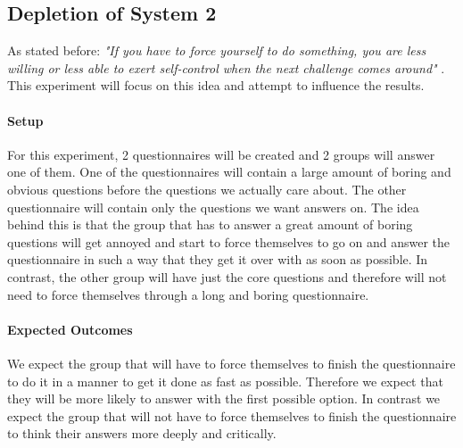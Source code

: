 \documentclass[main.tex]{subfiles}
\begin{document}
\subsection{Depletion of System 2}
As stated before:\emph{ "If you have to force yourself to do something, you are less willing or less able to exert self-control when the next challenge comes around" }.
This experiment will focus on this idea and attempt to influence the results.

\paragraph{Setup} For this experiment, 2 questionnaires will be created and 2 groups will answer one of them. One of the questionnaires will contain a large amount of boring and obvious questions before the questions we actually care about. The other questionnaire will contain only the questions we want answers on. The idea behind this is that the group that has to answer a great amount of boring questions will get annoyed and start to force themselves to go on and answer the questionnaire in such a way that they get it over with as soon as possible. In contrast, the other group will have just the core questions and therefore will not need to force themselves through a long and boring questionnaire.

\paragraph{Expected Outcomes}We expect the group that will have to force themselves to finish the questionnaire to do it in a manner to get it done as fast as possible. Therefore we expect that they will be more likely to answer with the first possible option. In contrast we expect the group that will not have to force themselves to finish the questionnaire  to think their answers more deeply and critically.
\end{document}
